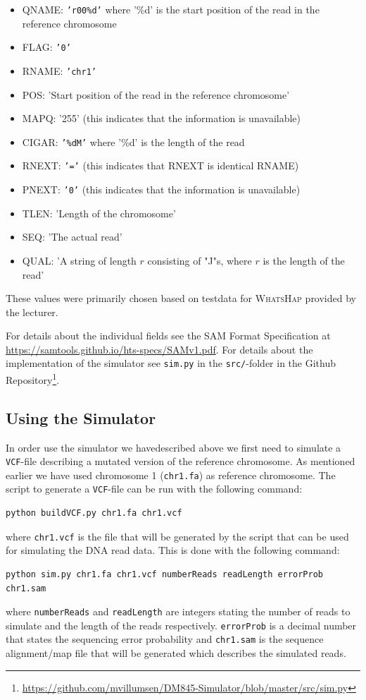 \documentclass[10pt,a4paper]{article}
\begin{document}
\begin{itemize}
\item QNAME: \texttt{'r00\%d'} where '\%d' is the start position of the read in the reference chromosome
\item FLAG: \texttt{'0'}
\item RNAME: \texttt{'chr1'}
\item POS: 'Start position of the read in the reference chromosome'
\item MAPQ: '255' (this indicates that the information is unavailable)
\item CIGAR: \texttt{'\%dM'} where '\%d' is the length of the read
\item RNEXT: \texttt{'='} (this indicates that RNEXT is identical RNAME)
\item PNEXT: \texttt{'0'} (this indicates that the information is unavailable)
\item TLEN: 'Length of the chromosome'
\item SEQ: 'The actual read'
\item QUAL: 'A string of length $r$ consisting of "J"s, where $r$ is the length of the read'
\end{itemize} 
These values were primarily chosen based on testdata for \textsc{WhatsHap} provided by the lecturer.

For details about the individual fields see the SAM Format Specification at \url{https://samtools.github.io/hts-specs/SAMv1.pdf}. For details about the implementation of the simulator see \texttt{sim.py} in the \texttt{src/}-folder in the Github Repository\footnote{\url{https://github.com/mvillumsen/DM845-Simulator/blob/master/src/sim.py}}.

\subsection{Using the Simulator}
In order use the simulator we havedescribed above we first need to simulate a \texttt{VCF}-file describing a mutated version of the reference chromosome. As mentioned earlier we have used chromosome 1 (\texttt{chr1.fa}) as reference chromosome. The script to generate a \texttt{VCF}-file can be run with the following command:
\begin{lstlisting}
python buildVCF.py chr1.fa chr1.vcf
\end{lstlisting}
where \texttt{chr1.vcf} is the file that will be generated by the script that can be used for simulating the DNA read data. This is done with the following command:
\begin{lstlisting}
python sim.py chr1.fa chr1.vcf numberReads readLength errorProb chr1.sam
\end{lstlisting}
where \texttt{numberReads} and \texttt{readLength} are integers stating the number of reads to simulate and the length of the reads respectively. \texttt{errorProb} is a decimal number that states the sequencing error probability and \texttt{chr1.sam} is the sequence alignment/map file that will be generated which describes the simulated reads.
\end{document}

